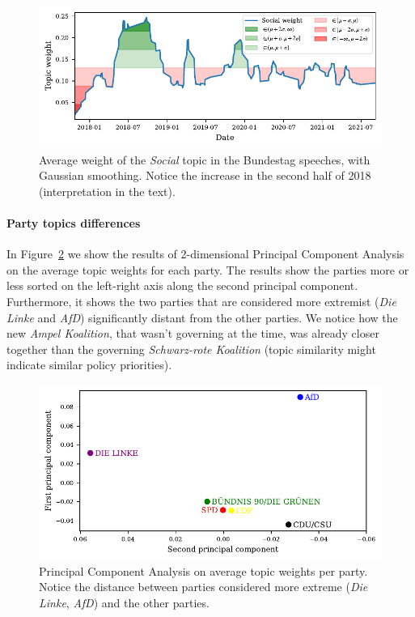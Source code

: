 \documentclass{article}
\begin{document}
\begin{figure}
  \centering
  \includegraphics[width=0.9\linewidth]{images/Social.pdf}
  \captionsetup{width=0.9\linewidth}
  \caption{
    Average weight of the \textit{Social} topic in the Bundestag speeches, with Gaussian smoothing.
    Notice the increase in the second half of 2018 (interpretation in the text).
  }
  \label{social_topic_plot}
\end{figure}


\paragraph{Party topics differences}
In Figure~\ref{pca_plot} we show the results of 2-dimensional Principal Component Analysis on the average topic weights for each party.
The results show the parties more or less sorted on the left-right axis along the second principal component.
Furthermore, it shows the two parties that are considered more extremist (\textit{Die Linke} and \textit{AfD}) significantly distant from the other parties.
We notice how the new \textit{Ampel Koalition}, that wasn't governing at the time, was already closer together than the governing \textit{Schwarz-rote Koalition} (topic similarity might indicate similar policy priorities).

\begin{figure}
  \centering
  \includegraphics[width=0.9\linewidth]{images/pca.pdf}
  \captionsetup{width=0.9\linewidth}
  \caption{
    Principal Component Analysis on average topic weights per party.
    Notice the distance between parties considered more extreme (\textit{Die Linke}, \textit{AfD}) and the other parties.
  }
  \label{pca_plot}
\end{figure}
\end{document}
